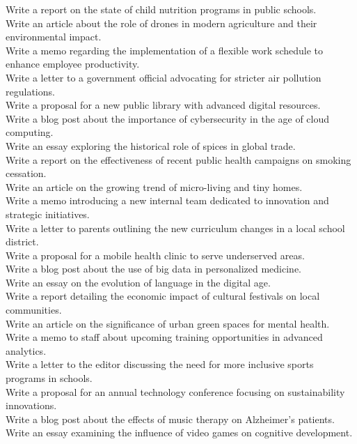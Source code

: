 \begin{examplebox}
Write a report on the state of child nutrition programs in public schools. \\
Write an article about the role of drones in modern agriculture and their environmental impact. \\
Write a memo regarding the implementation of a flexible work schedule to enhance employee productivity. \\
Write a letter to a government official advocating for stricter air pollution regulations. \\
Write a proposal for a new public library with advanced digital resources. \\
Write a blog post about the importance of cybersecurity in the age of cloud computing. \\
Write an essay exploring the historical role of spices in global trade. \\
Write a report on the effectiveness of recent public health campaigns on smoking cessation. \\
Write an article on the growing trend of micro-living and tiny homes. \\
Write a memo introducing a new internal team dedicated to innovation and strategic initiatives. \\
Write a letter to parents outlining the new curriculum changes in a local school district. \\
Write a proposal for a mobile health clinic to serve underserved areas. \\
Write a blog post about the use of big data in personalized medicine. \\
Write an essay on the evolution of language in the digital age. \\
Write a report detailing the economic impact of cultural festivals on local communities. \\
Write an article on the significance of urban green spaces for mental health. \\
Write a memo to staff about upcoming training opportunities in advanced analytics. \\
Write a letter to the editor discussing the need for more inclusive sports programs in schools. \\
Write a proposal for an annual technology conference focusing on sustainability innovations. \\
Write a blog post about the effects of music therapy on Alzheimer's patients. \\
Write an essay examining the influence of video games on cognitive development. \\

\end{examplebox}
